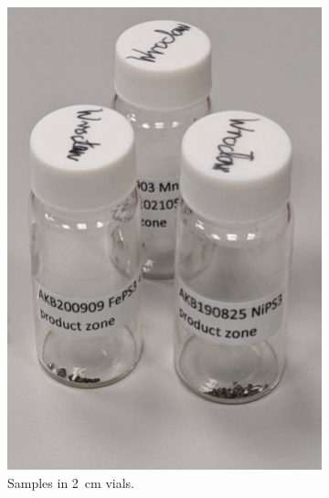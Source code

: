 \documentclass[
	twoside,
	parskip=half,
	a4paper,
]{scrbook}
\begin{document}
\begin{figure}
	\centering
	\begin{subfigure}[t]{.25\textwidth}
		\vskip 0pt
		\includegraphics[width=\textwidth]{../../photos/bulk_sample.jpg}
		\caption{Samples in \SI{2}{cm} vials.}
		\label{fig:samples_vials}
	\end{subfigure}
	\begin{subfigure}[t]{.25\textwidth}
		\vskip 0pt

\end{subfigure}
\end{figure}
\end{document}
